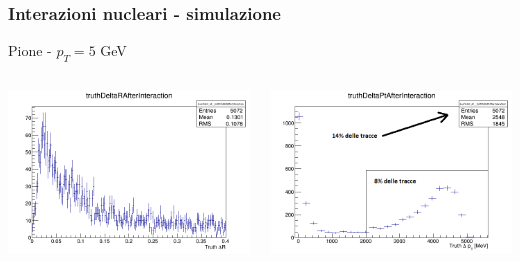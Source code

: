 \documentclass{beamer}
\begin{document}
\begin{frame}
\frametitle{Interazioni nucleari - simulazione}
Pione - $p_{T} = 5$ GeV
\bigskip
\centering
\begin{columns}
\begin{column}{.5\textwidth}
\includegraphics[width=\textwidth]{Tracking/pi5pu0_truthDeltaRAfterInteraction}
\end{column}
\begin{column}{.5\textwidth}
\includegraphics[width=\textwidth]{Tracking/pi5pu0_truthDeltaPtAfterInteraction}
\end{column}
\end{columns}
\end{frame}

\end{document}
